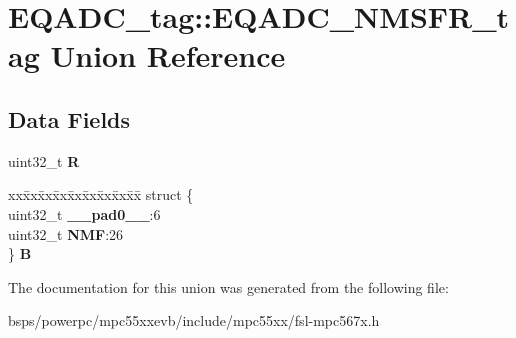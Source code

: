 \hypertarget{unionEQADC__tag_1_1EQADC__NMSFR__tag}{}\section{E\+Q\+A\+D\+C\+\_\+tag\+::E\+Q\+A\+D\+C\+\_\+\+N\+M\+S\+F\+R\+\_\+tag Union Reference}
\label{unionEQADC__tag_1_1EQADC__NMSFR__tag}
\subsection*{Data Fields}
\begin{DoxyCompactItemize}
\item 
\mbox{\label{unionEQADC__tag_1_1EQADC__NMSFR__tag_a0195d5363518761872da10d6fbd8c01e}} 
uint32\+\_\+t {\bfseries R}
\item 
\mbox{\label{unionEQADC__tag_1_1EQADC__NMSFR__tag_a0bc4d5ecf4956dd868641ad8d178194d}} 
\begin{tabbing}
xx\=xx\=xx\=xx\=xx\=xx\=xx\=xx\=xx\=\kill
struct \{\\
\>uint32\_t {\bfseries \_\_pad0\_\_}:6\\
\>uint32\_t {\bfseries NMF}:26\\
\} {\bfseries B}\\

\end{tabbing}\end{DoxyCompactItemize}


The documentation for this union was generated from the following file\+:\begin{DoxyCompactItemize}
\item 
bsps/powerpc/mpc55xxevb/include/mpc55xx/fsl-\/mpc567x.\+h\end{DoxyCompactItemize}
